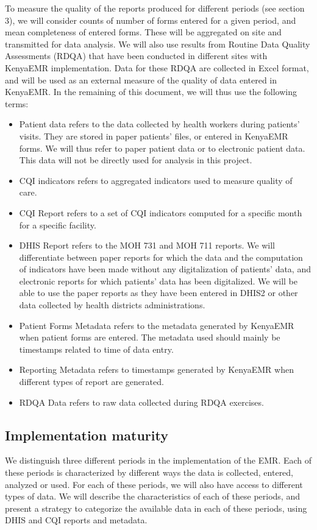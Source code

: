\documentclass[a4paper,11pt,final,twoside]{article}
\begin{document}
To measure the quality of the reports produced for different periods (see section 3), we will consider counts of number of forms entered for a given period, and mean completeness of entered forms. These will be aggregated on site and transmitted for data analysis. We will also use results from Routine Data Quality Assessments (RDQA) that have been conducted in different sites with KenyaEMR implementation. Data for these RDQA are collected in Excel format, and will be used as an external measure of the quality of data entered in KenyaEMR.
In the remaining of this document, we will thus use the following terms:
\begin{itemize}
\item Patient data refers to the data collected by health workers during patients’ visits. They are stored in paper patients’ files, or entered in KenyaEMR forms. We will thus refer to paper patient data or to electronic patient data. This data will not be directly used for analysis in this project.
\item CQI indicators refers to aggregated indicators used to measure quality of care.
\item CQI Report refers to a set of CQI indicators computed for a specific month for a specific facility.
\item DHIS Report refers to the MOH 731 and MOH 711 reports. We will differentiate between paper reports for which the data and the computation of indicators have been made without any digitalization of patients’ data, and electronic reports for which patients’ data has been digitalized. We will be able to use the paper reports as they have been entered in DHIS2 or other data collected by health districts administrations.
\item Patient Forms Metadata refers to the metadata generated by KenyaEMR when patient forms are entered. The metadata used should mainly be timestamps related to time of data entry.
\item Reporting Metadata refers to timestamps generated by KenyaEMR when different types of report are generated.
\item RDQA Data refers to raw data collected during RDQA exercises.
\end{itemize}

    \subsection{Implementation maturity}

We distinguish three different periods in the implementation of the EMR. Each of these periods is characterized by different ways the data is collected, entered, analyzed or used. For each of these periods, we will also have access to different types of data. We will describe the characteristics of each of these periods, and present a strategy to categorize the available data in each of these periods, using DHIS and CQI reports and metadata.
\end{document}
